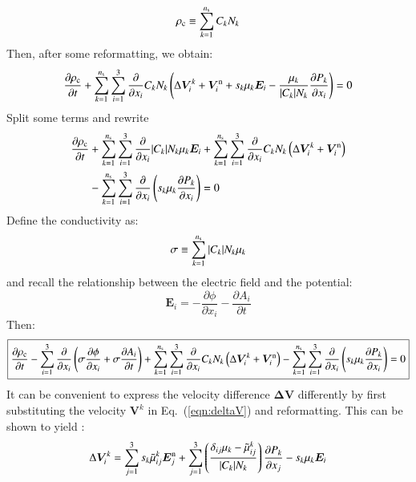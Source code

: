 \documentclass{warpdoc}
\newcommand{\alb}{\vspace{0.2cm}\\} %
\newcommand{\ns}{{n_{\rm s}}}
\newcommand\frameeqn[1]{\fbox{$\displaystyle #1$}}
\newcommand{\nd}{3}
\renewcommand{\vec}[1]{\bm{#1}}
\begin{document}
%
\begin{equation}
\rho_{\rm c}\equiv
\sum_{k=1}^\ns C_k N_k
\end{equation}
%
Then, after some reformatting, we obtain:
%
\begin{equation}
  \frac{\partial \rho_{\rm c}}{\partial t} + \sum_{k=1}^\ns\sum_{i=1}^3 \frac{\partial}{\partial x_i} C_k N_k \left(\Delta \vec{V}^k_i+\vec{V}^{\rm n}_i+ s_k \mu_k  \vec{E}_i  -   \frac{\mu_k}{|C_k| N_k} \frac{\partial P_k}{\partial x_i} \right) = 0
\end{equation}
%
Split some terms and rewrite
%
\begin{align}
  \frac{\partial \rho_{\rm c}}{\partial t} 
&+ \sum_{k=1}^\ns\sum_{i=1}^3 \frac{\partial}{\partial x_i} |C_k| N_k  \mu_k  \vec{E}_i   
+ \sum_{k=1}^\ns\sum_{i=1}^3 \frac{\partial}{\partial x_i} C_k N_k \left(\Delta \vec{V}^k_i+\vec{V}^{\rm n}_i \right) \nonumber\alb
&- \sum_{k=1}^\ns\sum_{i=1}^3 \frac{\partial}{\partial x_i}  \left({s_k \mu_k} \frac{\partial P_k}{\partial x_i} \right) 
= 0
\end{align}
%
Define the conductivity as:
%
\begin{equation}
\sigma \equiv \sum_{k=1}^\ns |C_k| N_k \mu_k
\end{equation}
%
and recall the relationship between the electric field and the potential:
%
\begin{equation}
\vec{E}_i = -\frac{\partial \phi}{\partial x_i} -\frac{\partial A_i}{\partial t}
\end{equation}
%
Then:
%
\begin{equation}
\frameeqn{
  \frac{\partial \rho_{\rm c}}{\partial t} 
- \sum_{i=1}^3 \frac{\partial}{\partial x_i}\left( \sigma  \frac{\partial \phi}{\partial x_i} + \sigma  \frac{\partial A_i}{\partial t}   \right)
+ \sum_{k=1}^\ns\sum_{i=1}^3 \frac{\partial}{\partial x_i} C_k N_k \left(\Delta \vec{V}^k_i+\vec{V}^{\rm n}_i \right) 
- \sum_{k=1}^\ns\sum_{i=1}^3 \frac{\partial}{\partial x_i}  \left({s_k \mu_k} \frac{\partial P_k}{\partial x_i} \right) 
= 0
}
\label{eqn:phitransport}
\end{equation}
%
It can be convenient to express the velocity difference $\vec{\Delta V}$ differently by first substituting the velocity $\vec{V}^k$ in Eq.\ (\ref{eqn:deltaV}) and reformatting. This can be shown to yield \cite{jcp:2015:parent}:
%
\begin{equation}
 \Delta \vec{V}_i^k = 
   \sum_{j=1}^\nd s_k \wtilde{\mu}^k_{ij}  \vec{E}_j^{\rm n}
      + \sum_{j=1}^\nd  \left(\frac{\delta_{ij} \mu_k-\wtilde{\mu}^{k}_{ij}}{|C_k| N_k}\right) \frac{\partial P_k}{\partial x_j}
-  s_k \mu_k  \vec{E}_i
\end{equation}
%
\end{document}
